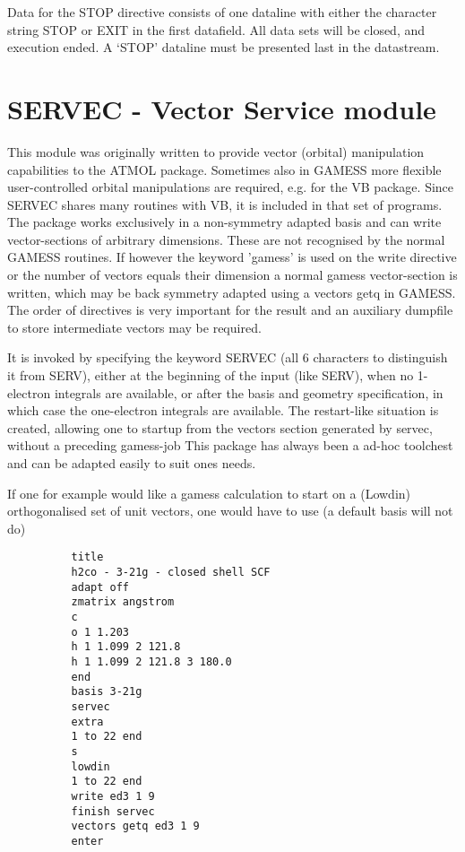\documentclass[11pt,fleqn]{article}
\begin{document}
Data for the STOP directive consists of one dataline with either the
character string STOP or EXIT in the first datafield. All  data
sets will be closed, and execution ended. A `STOP' dataline must be
presented last in the datastream.


\section{SERVEC - Vector Service module}

This module was originally written  to provide vector (orbital) 
manipulation capabilities to the ATMOL package. Sometimes also in GAMESS
more flexible user-controlled orbital manipulations are required,
e.g. for the VB package. Since SERVEC shares many routines with VB, 
it is included in that set of programs. 
The package works exclusively in a non-symmetry adapted basis
and can write vector-sections of arbitrary dimensions. These are
not recognised by the normal GAMESS routines. If however the keyword
'gamess' is used on the write directive or the number of vectors equals 
their dimension a normal gamess vector-section
is written, which may be back symmetry adapted using a 
vectors getq in GAMESS.
The order of directives is very important for the result and 
an auxiliary dumpfile to store intermediate vectors may be required.

It is invoked by specifying the keyword SERVEC (all 6 characters to distinguish
it from SERV), either at the beginning of the input (like SERV), when no 1-electron
integrals are available, or after the basis and geometry specification, in which case
the one-electron integrals are available. The restart-like situation is created, allowing
one to startup from the vectors section generated by servec, without a preceding gamess-job
This package has always been a ad-hoc toolchest and can be adapted easily to suit ones needs.

If one for example would like a gamess calculation to start on a (Lowdin) orthogonalised
set of unit vectors, one would have to use (a default basis will not do)
 
{
\footnotesize
\begin{verbatim}
          title
          h2co - 3-21g - closed shell SCF
          adapt off
          zmatrix angstrom
          c
          o 1 1.203
          h 1 1.099 2 121.8
          h 1 1.099 2 121.8 3 180.0
          end
          basis 3-21g
          servec
          extra 
          1 to 22 end
          s
          lowdin
          1 to 22 end
          write ed3 1 9
          finish servec
          vectors getq ed3 1 9
          enter
\end{verbatim}
}
\end{document}

